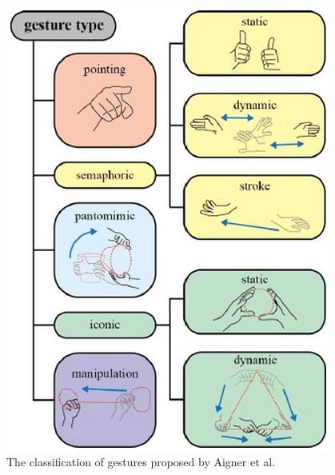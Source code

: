 \begin{figure}[htb]
\centering
 \includegraphics[width=0.5\columnwidth]{figures/gestureTypes.png}
 \caption[]{The classification of gestures proposed by Aigner et al. \cite{AignerTaxonomy}}
 \label{gesturetypes}
\end{figure}

